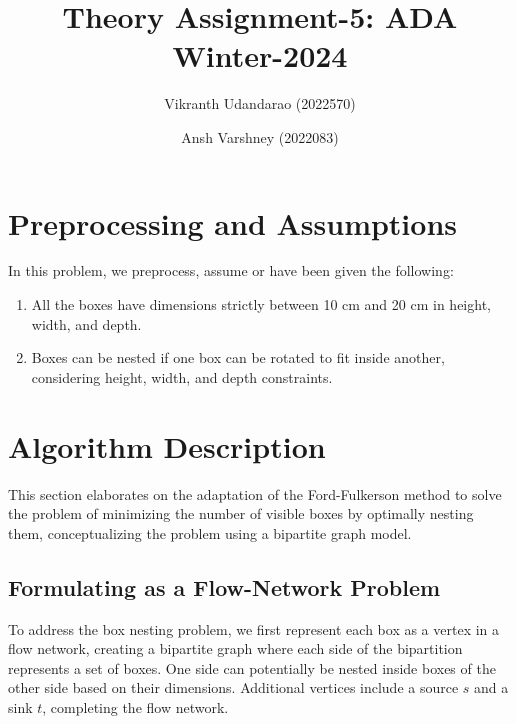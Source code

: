 \documentclass{article}
\title{Theory Assignment-5: ADA Winter-2024}
\author{Vikranth Udandarao (2022570) \and Ansh Varshney (2022083)}
\date{}
\begin{document}
\maketitle

\section{Preprocessing and Assumptions}
    In this problem, we preprocess, assume or have been given the following:

    \begin{enumerate}
        \item All the boxes have dimensions strictly between 10 cm and 20 cm in height, width, and depth.
        \item Boxes can be nested if one box can be rotated to fit inside another, considering height, width, and depth constraints.
    \end{enumerate}

\section{Algorithm Description}

    This section elaborates on the adaptation of the Ford-Fulkerson method to solve the problem of minimizing the number of visible boxes by optimally nesting them, conceptualizing the problem using a bipartite graph model.
    
    \subsection{Formulating as a Flow-Network Problem}
        To address the box nesting problem, we first represent each box as a vertex in a flow network, creating a bipartite graph where each side of the bipartition represents a set of boxes. One side can potentially be nested inside boxes of the other side based on their dimensions. Additional vertices include a source \(s\) and a sink \(t\), completing the flow network.
\end{document}
